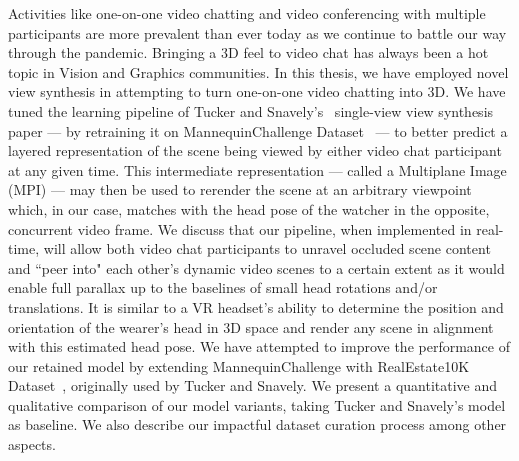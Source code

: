 Activities like one-on-one video chatting and video conferencing with multiple participants are more prevalent than ever today as we continue to battle our way through the pandemic. Bringing a 3D feel to video chat has always been a hot topic in Vision and Graphics communities. In this thesis, we have employed novel view synthesis in attempting to turn one-on-one video chatting into 3D. We have tuned the learning pipeline of Tucker and Snavely's~\cite{single_view_mpi} single-view view synthesis paper --- by retraining it on MannequinChallenge Dataset~\cite{li2019learning} --- to better predict a layered representation of the scene being viewed by either video chat participant at any given time. This intermediate representation --- called a Multiplane Image (MPI) --- may then be used to rerender the scene at an arbitrary viewpoint which, in our case, matches with the head pose of the watcher in the opposite, concurrent video frame. We discuss that our pipeline, when implemented in real-time, will allow both video chat participants to unravel occluded scene content and ``peer into" each other's dynamic video scenes to a certain extent as it would enable full parallax up to the baselines of small head rotations and/or translations. It is similar to a VR headset's ability to determine the position and orientation of the wearer's head in 3D space and render any scene in alignment with this estimated head pose. We have attempted to improve the performance of our retained model by extending MannequinChallenge with RealEstate10K Dataset~\cite{zhou2018stereo}, originally used by Tucker and Snavely. We present a quantitative and qualitative comparison of our model variants, taking Tucker and Snavely's model as baseline. We also describe our impactful dataset curation process among other aspects.